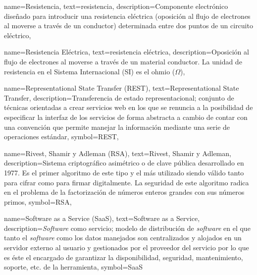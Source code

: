 {
    name={Resistencia},
    text={resistencia},
    description={Componente electrónico diseñado para introducir una resistencia eléctrica (oposición al flujo de electrones al moverse a través de un conductor) determinada entre dos puntos de un circuito eléctrico},
}

{
    name={Resistencia Eléctrica},
    text={resistencia eléctrica},
    description={Oposición al flujo de electrones al moverse a través de un material conductor. La unidad de resistencia en el Sistema Internacional (SI) es el ohmio ($\Omega$)},
}

{
    name={Representational State Transfer (REST)},
    text={Representational State Transfer},
    description={Transferencia de estado representacional; conjunto de técnicas orientadas a crear servicios web en los que se renuncia a la posibilidad de especificar la interfaz de los servicios de forma abstracta a cambio de contar con una convención que permite manejar la información mediante una serie de operaciones estándar},
    symbol={REST},
}

{
    name={Rivest, Shamir y Adleman (RSA)},
    text={Rivest, Shamir y Adleman},
    description={Sistema criptográfico asimétrico o de clave pública desarrollado en 1977. Es el primer algoritmo de este tipo y el más utilizado siendo válido tanto para cifrar como para firmar digitalmente. La seguridad de este algoritmo radica en el problema de la factorización de números enteros grandes con sus números primos},
    symbol={RSA},
}

{
    name={Software as a Service (SaaS)},
    text={Software as a Service},
    description={\textit{Software} como servicio; modelo de distribución de \textit{software} en el que tanto el \textit{software} como los datos manejados son centralizados y alojados en un servidor externo al usuario y gestionados por el proveedor del servicio por lo que es éste el encargado de garantizar la disponibilidad, seguridad, mantenimiento, soporte, etc. de la herramienta},
    symbol={SaaS}
}

